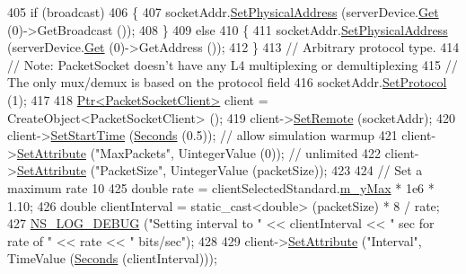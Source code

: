 \begin{DoxyCode}
405   \textcolor{keywordflow}{if} (broadcast)
406     \{
407       socketAddr.\hyperlink{classns3_1_1PacketSocketAddress_a9452f9410a97e57344e464e25c2ab0f3}{SetPhysicalAddress} (serverDevice.\hyperlink{classns3_1_1NetDeviceContainer_a677d62594b5c9d2dea155cc5045f4d0b}{Get} (0)->GetBroadcast ());
408     \}
409   \textcolor{keywordflow}{else}
410     \{
411       socketAddr.\hyperlink{classns3_1_1PacketSocketAddress_a9452f9410a97e57344e464e25c2ab0f3}{SetPhysicalAddress} (serverDevice.\hyperlink{classns3_1_1NetDeviceContainer_a677d62594b5c9d2dea155cc5045f4d0b}{Get} (0)->GetAddress ());
412     \}
413   \textcolor{comment}{// Arbitrary protocol type.}
414   \textcolor{comment}{// Note: PacketSocket doesn't have any L4 multiplexing or demultiplexing}
415   \textcolor{comment}{//       The only mux/demux is based on the protocol field}
416   socketAddr.\hyperlink{classns3_1_1PacketSocketAddress_a9020962e39c238277f3b2f0de605647a}{SetProtocol} (1);
417 
418   \hyperlink{classns3_1_1Ptr}{Ptr<PacketSocketClient>} client = CreateObject<PacketSocketClient> ();
419   client->\hyperlink{classns3_1_1PacketSocketClient_ae400727c451d429358b5c85838b901df}{SetRemote} (socketAddr);
420   client->\hyperlink{classns3_1_1Application_a8360a49748e30c52ffdcc7a305c3cd48}{SetStartTime} (\hyperlink{group__timecivil_ga33c34b816f8ff6628e33d5c8e9713b9e}{Seconds} (0.5));  \textcolor{comment}{// allow simulation warmup}
421   client->\hyperlink{classns3_1_1ObjectBase_ac60245d3ea4123bbc9b1d391f1f6592f}{SetAttribute} (\textcolor{stringliteral}{"MaxPackets"}, UintegerValue (0));  \textcolor{comment}{// unlimited}
422   client->\hyperlink{classns3_1_1ObjectBase_ac60245d3ea4123bbc9b1d391f1f6592f}{SetAttribute} (\textcolor{stringliteral}{"PacketSize"}, UintegerValue (packetSize));
423 
424   \textcolor{comment}{// Set a maximum rate 10%
425   \textcolor{keywordtype}{double} rate = clientSelectedStandard.\hyperlink{structStandardInfo_a7037180b40be174fdb983b9c92084a1f}{m\_yMax} * 1e6 * 1.10;
426   \textcolor{keywordtype}{double} clientInterval = \textcolor{keyword}{static\_cast<}\textcolor{keywordtype}{double}\textcolor{keyword}{>} (packetSize) * 8 / rate;
427   \hyperlink{group__logging_ga413f1886406d49f59a6a0a89b77b4d0a}{NS\_LOG\_DEBUG} (\textcolor{stringliteral}{"Setting interval to "} << clientInterval << \textcolor{stringliteral}{" sec for rate of "} << rate << \textcolor{stringliteral}{"
       bits/sec"});
428 
429   client->\hyperlink{classns3_1_1ObjectBase_ac60245d3ea4123bbc9b1d391f1f6592f}{SetAttribute} (\textcolor{stringliteral}{"Interval"}, TimeValue (\hyperlink{group__timecivil_ga33c34b816f8ff6628e33d5c8e9713b9e}{Seconds} (clientInterval)));
}
\end{DoxyCode}
